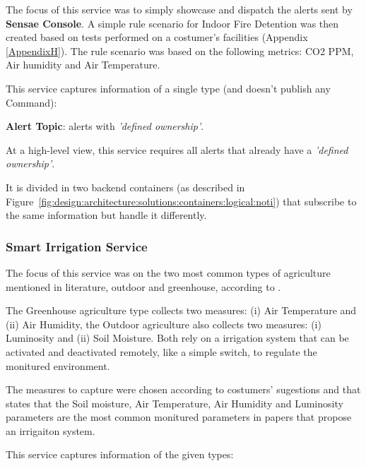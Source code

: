The focus of this service was to simply showcase and dispatch the alerts sent by \textbf{Sensae Console}. A simple rule scenario for Indoor Fire Detention was then created based on tests performed on a costumer's facilities (Appendix \ref{AppendixH}). The rule scenario was based on the following metrics: CO2 \gls{PPM}, Air humidity and Air Temperature.

This service captures information of a single type (and doesn't publish any Command):

\textbf{Alert Topic}: alerts with \textit{'defined ownership'}.

At a high-level view, this service requires all alerts that already have a \textit{'defined ownership'}.

It is divided in two backend containers (as described in Figure~\ref{fig:design:architecture:solutions:containers:logical:noti}) that subscribe to the same information but handle it differently.

\subsubsection{Smart Irrigation Service}
\label{subsubsec:implementation:description:services:irrigation}

The focus of this service was on the two most common types of agriculture mentioned in literature, outdoor and greenhouse, according to \cite{garcia2020iot}.

The Greenhouse agriculture type collects two measures: (i) Air Temperature and (ii) Air Humidity, the Outdoor agriculture also collects two measures: (i) Luminosity and (ii) Soil Moisture. Both rely on a irrigation system that can be activated and deactivated remotely, like a simple switch, to regulate the monitured environment.

The measures to capture were chosen according to costumers' sugestions and \cite{garcia2020iot} that states that the Soil moisture, Air Temperature, Air Humidity and Luminosity parameters are the most common monitured parameters in papers that propose an irrigaiton system. 

This service captures information of the given types:

